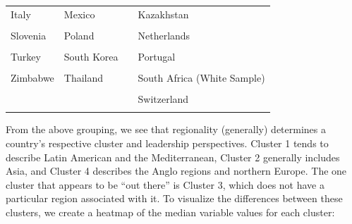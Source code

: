\documentclass[
]{article}
\begin{document}
\begin{table}[h]
\begin{tabular}[t]{>{}l>{}l>{}l>{}l}
\textcolor[HTML]{739999}{Italy} & \textcolor[HTML]{000026}{Mexico} & \textcolor[HTML]{407326}{} & \textcolor[HTML]{BF7300}{Kazakhstan}\\
\textcolor[HTML]{739999}{\cellcolor{gray!6}{Philippines}} & \textcolor[HTML]{000026}{\cellcolor{gray!6}{Nigeria}} & \textcolor[HTML]{407326}{\cellcolor{gray!6}{}} & \textcolor[HTML]{BF7300}{\cellcolor{gray!6}{Namibia}}\\
\textcolor[HTML]{739999}{Slovenia} & \textcolor[HTML]{000026}{Poland} & \textcolor[HTML]{407326}{} & \textcolor[HTML]{BF7300}{Netherlands}\\
\textcolor[HTML]{739999}{\cellcolor{gray!6}{Spain}} & \textcolor[HTML]{000026}{\cellcolor{gray!6}{Russia}} & \textcolor[HTML]{407326}{\cellcolor{gray!6}{}} & \textcolor[HTML]{BF7300}{\cellcolor{gray!6}{New Zealand}}\\
\addlinespace
\textcolor[HTML]{739999}{Turkey} & \textcolor[HTML]{000026}{South Korea} & \textcolor[HTML]{407326}{} & \textcolor[HTML]{BF7300}{Portugal}\\
\textcolor[HTML]{739999}{\cellcolor{gray!6}{Zambia}} & \textcolor[HTML]{000026}{\cellcolor{gray!6}{Taiwan}} & \textcolor[HTML]{407326}{\cellcolor{gray!6}{}} & \textcolor[HTML]{BF7300}{\cellcolor{gray!6}{Singapore}}\\
\textcolor[HTML]{739999}{Zimbabwe} & \textcolor[HTML]{000026}{Thailand} & \textcolor[HTML]{407326}{} & \textcolor[HTML]{BF7300}{South Africa (White Sample)}\\
\textcolor[HTML]{739999}{\cellcolor{gray!6}{}} & \textcolor[HTML]{000026}{\cellcolor{gray!6}{Venezuela}} & \textcolor[HTML]{407326}{\cellcolor{gray!6}{}} & \textcolor[HTML]{BF7300}{\cellcolor{gray!6}{Sweden}}\\
\textcolor[HTML]{739999}{} & \textcolor[HTML]{000026}{} & \textcolor[HTML]{407326}{} & \textcolor[HTML]{BF7300}{Switzerland}\\
\addlinespace
\textcolor[HTML]{739999}{\cellcolor{gray!6}{}} & \textcolor[HTML]{000026}{\cellcolor{gray!6}{}} & \textcolor[HTML]{407326}{\cellcolor{gray!6}{}} & \textcolor[HTML]{BF7300}{\cellcolor{gray!6}{USA}}\\
\bottomrule
\end{tabular}
\end{table}

From the above grouping, we see that regionality (generally) determines
a country's respective cluster and leadership perspectives. Cluster 1
tends to describe Latin American and the Mediterranean, Cluster 2
generally includes Asia, and Cluster 4 describes the Anglo regions and
northern Europe. The one cluster that appears to be ``out there'' is
Cluster 3, which does not have a particular region associated with it.
To visualize the differences between these clusters, we create a heatmap
of the median variable values for each cluster:
\end{document}
